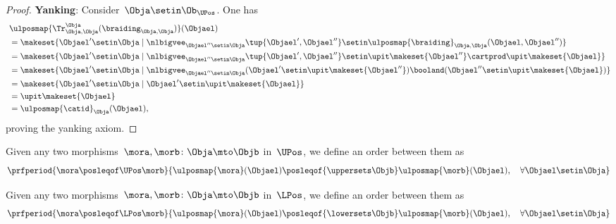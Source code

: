 \begin{proof}
    \textbf{Yanking}:
    Consider~$\Obja\setin \Ob_{\UPos}$.
    One has
    \begin{equation}
        \begin{aligned}
            ~ & \ulposmap{\Tr_{\Obja,\Obja}^{\Obja}(\braiding_{\Obja,\Obja})}(\Objael) \\
              & =\makeset{ \Objael'\setin \Obja \mid \nlbigvee_{\Objael''\setin \Obja}\tup{\Objael',\Objael''}\setin \ulposmap{\braiding}_{\Obja,\Obja}(\Objael,\Objael'')} \\
              & =\makeset{ \Objael'\setin \Obja \mid \nlbigvee_{\Objael''\setin \Obja}\tup{\Objael',\Objael''}\setin \upit\makeset{\Objael''}\cartprod \upit\makeset{ \Objael}} \\
              & =\makeset{ \Objael'\setin \Obja \mid \nlbigvee_{\Objael''\setin \Obja} (\Objael'\setin \upit\makeset{\Objael''}) \booland(\Objael'' \setin \upit\makeset{ \Objael})} \\
              & =\makeset{ \Objael'\setin \Obja \mid \Objael'\setin \upit\makeset{\Objael}} \\
              & =\upit \makeset{\Objael} \\
              & =\ulposmap{\catid}_\Obja(\Objael),
        \end{aligned}
    \end{equation}
    proving the yanking axiom.
\end{proof}

\begin{definition}
    \label{def:upos_order}
    Given any two morphisms~$\mora,\morb\colon \Obja \mto \Objb$ in~$\UPos$, we define an order between them as
    \begin{equation}
        \prfperiod{\mora \posleqof\UPos \morb}{\ulposmap{\mora}(\Objael)\posleqof{\uppersets \Objb} \ulposmap{\morb}(\Objael), \quad \forall \Objael \setin \Obja}
    \end{equation}
\end{definition}

\begin{definition}
    \label{def:lpos_order}
    Given any two morphisms~$\mora,\morb\colon \Obja \mto \Objb$ in~$\LPos$, we define an order between them as
    \begin{equation}
        \prfperiod{\mora \posleqof\LPos \morb}{\ulposmap{\mora}(\Objael)\posleqof{\lowersets \Objb} \ulposmap{\morb}(\Objael), \quad \forall \Objael \setin \Obja}
    \end{equation}
\end{definition}

